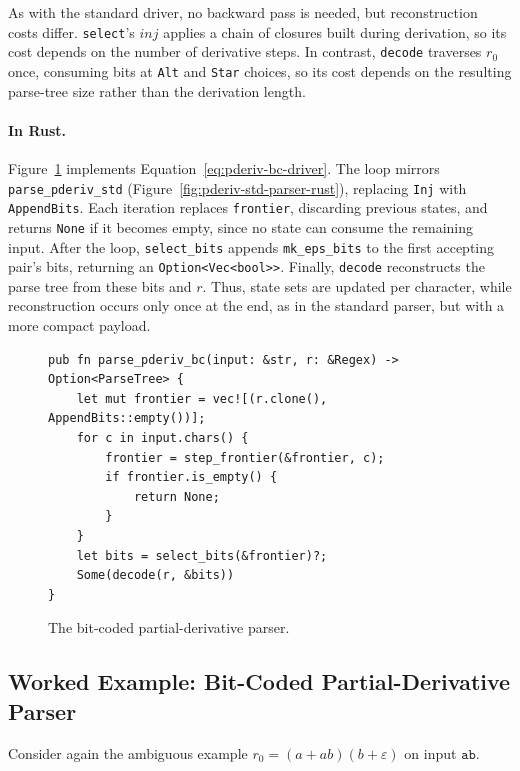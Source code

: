 %

As with the standard driver, no backward pass is needed,
but reconstruction costs differ.
\texttt{select}'s $\mathit{inj}$ applies a chain of closures
built during derivation, so its cost depends on the number
of derivative steps.
In contrast, \texttt{decode} traverses $r_0$ once,
consuming bits at \texttt{Alt} and \texttt{Star} choices,
so its cost depends on the resulting parse-tree size
rather than the derivation length.

\paragraph{In Rust.}
Figure~\ref{fig:pderiv-bc-parser-rust} implements
Equation~\eqref{eq:pderiv-bc-driver}.
The loop mirrors \texttt{parse\_pderiv\_std}
(Figure~\ref{fig:pderiv-std-parser-rust}),
replacing \texttt{Inj} with \texttt{AppendBits}.
Each iteration replaces \texttt{frontier}, discarding
previous states, and returns \texttt{None} if it becomes
empty, since no state can consume the remaining input.
After the loop, \texttt{select\_bits} appends
\texttt{mk\_eps\_bits} to the first accepting pair's bits,
returning an \texttt{Option<Vec<bool>{}>}.
Finally, \texttt{decode} reconstructs the parse tree
from these bits and $r$.
Thus, state sets are updated per character,
while reconstruction occurs only once at the end,
as in the standard parser, but with a more compact payload.

\begin{figure}[H]
\small
\begin{verbatim}
pub fn parse_pderiv_bc(input: &str, r: &Regex) -> Option<ParseTree> {
    let mut frontier = vec![(r.clone(), AppendBits::empty())];
    for c in input.chars() {
        frontier = step_frontier(&frontier, c);
        if frontier.is_empty() {
            return None;
        }
    }
    let bits = select_bits(&frontier)?;
    Some(decode(r, &bits))
}
\end{verbatim}
\caption{The bit-coded partial-derivative parser.}
\label{fig:pderiv-bc-parser-rust}
\end{figure}

%
%
%

\clearpage
\subsection{Worked Example: Bit-Coded Partial-Derivative Parser}
\label{sec:pderiv-bc-worked}

Consider again the ambiguous example $r_0 = (a + ab)(b + \varepsilon)$ on
input $\mathtt{ab}$.

